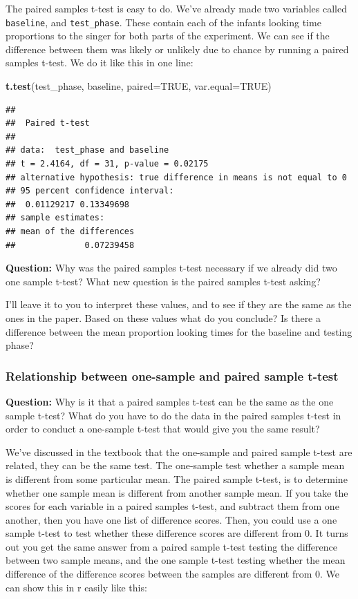 \documentclass[]{book}
\newenvironment{Shaded}{\begin{snugshade}}{\end{snugshade}}
\newcommand{\KeywordTok}[1]{\textcolor[rgb]{0.13,0.29,0.53}{\textbf{{#1}}}}
\newcommand{\DataTypeTok}[1]{\textcolor[rgb]{0.13,0.29,0.53}{{#1}}}
\newcommand{\OtherTok}[1]{\textcolor[rgb]{0.56,0.35,0.01}{{#1}}}
\newcommand{\NormalTok}[1]{{#1}}
\theoremstyle{definition}
\theoremstyle{definition}
\theoremstyle{definition}
\theoremstyle{remark}
\begin{document}
The paired samples t-test is easy to do. We've already made two
variables called \texttt{baseline}, and \texttt{test\_phase}. These
contain each of the infants looking time proportions to the singer for
both parts of the experiment. We can see if the difference between them
was likely or unlikely due to chance by running a paired samples t-test.
We do it like this in one line:

\begin{Shaded}
\begin{Highlighting}[]
\KeywordTok{t.test}\NormalTok{(test_phase, baseline, }\DataTypeTok{paired=}\OtherTok{TRUE}\NormalTok{, }\DataTypeTok{var.equal=}\OtherTok{TRUE}\NormalTok{)}
\end{Highlighting}
\end{Shaded}

\begin{verbatim}
## 
##  Paired t-test
## 
## data:  test_phase and baseline
## t = 2.4164, df = 31, p-value = 0.02175
## alternative hypothesis: true difference in means is not equal to 0
## 95 percent confidence interval:
##  0.01129217 0.13349698
## sample estimates:
## mean of the differences 
##              0.07239458
\end{verbatim}

\textbf{Question:} Why was the paired samples t-test necessary if we
already did two one sample t-test? What new question is the paired
samples t-test asking?

I'll leave it to you to interpret these values, and to see if they are
the same as the ones in the paper. Based on these values what do you
conclude? Is there a difference between the mean proportion looking
times for the baseline and testing phase?

\subsubsection{Relationship between one-sample and paired sample
t-test}\label{relationship-between-one-sample-and-paired-sample-t-test}

\textbf{Question:} Why is it that a paired samples t-test can be the
same as the one sample t-test? What do you have to do the data in the
paired samples t-test in order to conduct a one-sample t-test that would
give you the same result?

We've discussed in the textbook that the one-sample and paired sample
t-test are related, they can be the same test. The one-sample test
whether a sample mean is different from some particular mean. The paired
sample t-test, is to determine whether one sample mean is different from
another sample mean. If you take the scores for each variable in a
paired samples t-test, and subtract them from one another, then you have
one list of difference scores. Then, you could use a one sample t-test
to test whether these difference scores are different from 0. It turns
out you get the same answer from a paired sample t-test testing the
difference between two sample means, and the one sample t-test testing
whether the mean difference of the difference scores between the samples
are different from 0. We can show this in r easily like this:
\end{document}
